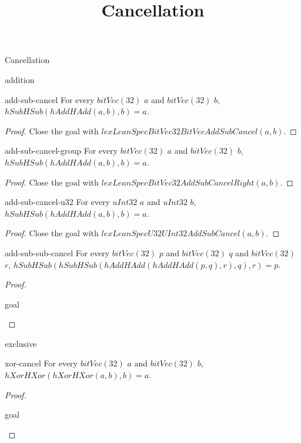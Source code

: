 \begin{lexlean}{Cancellation}
\title{Cancellation}

\begin{section}{addition}
  \begin{theorem}{add-sub-cancel}
  For every \(bitVec(32)\) \(a\) and \(bitVec(32)\) \(b\), \(hSubHSub(hAddHAdd(a, b), b) = a\).
  \begin{proof}
  Close the goal with \(lexLeanSpecBitVec32BitVecAddSubCancel(a, b)\).
  \end{proof}
  \end{theorem}

  \begin{theorem}{add-sub-cancel-group}
  For every \(bitVec(32)\) \(a\) and \(bitVec(32)\) \(b\), \(hSubHSub(hAddHAdd(a, b), b) = a\).
  \begin{proof}
  Close the goal with \(lexLeanSpecBitVec32AddSubCancelRight(a, b)\).
  \end{proof}
  \end{theorem}

  \begin{theorem}{add-sub-cancel-u32}
  For every \(uInt32\) \(a\) and \(uInt32\) \(b\), \(hSubHSub(hAddHAdd(a, b), b) = a\).
  \begin{proof}
  Close the goal with \(lexLeanSpecU32UInt32AddSubCancel(a, b)\).
  \end{proof}
  \end{theorem}

  \begin{lemma}{add-sub-sub-cancel}
  For every \(bitVec(32)\) \(p\) and \(bitVec(32)\) \(q\) and \(bitVec(32)\) \(r\), \(hSubHSub(hSubHSub(hAddHAdd(hAddHAdd(p, q), r), q), r) = p\).
  \begin{proof}
  \begin{rewrite}{goal}
  \end{rewrite}
  \end{proof}
  \end{lemma}
\end{section}

\begin{section}{exclusive}
  \begin{theorem}{xor-cancel}
  For every \(bitVec(32)\) \(a\) and \(bitVec(32)\) \(b\), \(hXorHXor(hXorHXor(a, b), b) = a\).
  \begin{proof}
  \begin{rewrite}{goal}
  \end{rewrite}
  \end{proof}
  \end{theorem}


\end{section}
\end{lexlean}
